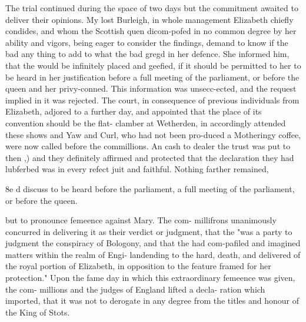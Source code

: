 \documentclass{article}
\begin{document}
The trial continued during the space of two days but the commitment awaited to deliver their opinions. My lost Burleigh, in whole management Elizabeth chiefly condides, and whom the Scottish quen dicom-pofed in no common degree by her ability and vigors, being eager to consider the findings, demand to know if the bad any thing to add to what the bad gregd in her defence. She informed him, that the would be infinitely placed and geefied, if it should be permitted to her to be heard in her justification before a full meeting of the parliament, or before the queen and her privy-conned. This information was unsecc-ected, and the request implied in it was rejected. The court, in consequence of previous individuals from Elizabeth, adjored to a further day, and appointed that the place of its convention should be the flat- clamber at Wetherden, in accordingly attended these shows and Yaw and Curl, who had not been pro-duced a Motheringy coffee, were now called before the commillions. An cash to dealer the trust was put to then ,) and they definitely affirmed and protected that the declaration they had lubferbed was in every refect juit and faithful. Nothing farther remained,

8e d discuss to be heard before the parliament, a full meeting of the parliament, or before the queen.

but to pronounce femeence against Mary. The com- millifrons unanimously concurred in delivering it as their verdict or judgment, that the "was a party to judgment the conspiracy of Bologony, and that the had com-pafiled and imagined matters within the realm of Engi- landending to the hard, death, and delivered of the royal portion of Elizabeth, in opposition to the feature framed for her protection." Upon the fame day in which this extraordinary femeence was given, the com- millions and the judges of England lifted a decla- ration which imported, that it was not to derogate in any degree from the titles and honour of the King of Stots.
\end{document}
